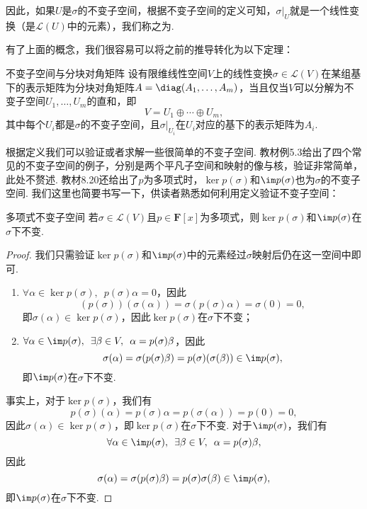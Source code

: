 因此，如果$U$是$\sigma$的不变子空间，根据不变子空间的定义可知，$\sigma\vert_U$就是一个线性变换（是$\mathcal{L}(U)$中的元素），我们称之为.

有了上面的概念，我们很容易可以将之前的推导转化为以下定理：
\begin{theorem}{}{不变子空间与分块对角矩阵}
    设有限维线性空间$V$上的线性变换$\sigma\in\mathcal{L}(V)$在某组基下的表示矩阵为分块对角矩阵$A=\diag(A_1,\ldots,A_m)$，当且仅当$V$可以分解为不变子空间$U_1,\ldots,U_m$的直和，即
    \[V=U_1\oplus\cdots\oplus U_m,\]
    其中每个$U_i$都是$\sigma$的不变子空间，且$\sigma\vert_{U_i}$在$U_i$对应的基下的表示矩阵为$A_i$.
\end{theorem}

根据定义我们可以验证或者求解一些很简单的不变子空间. 教材例5.3给出了四个常见的不变子空间的例子，分别是两个平凡子空间和映射的像与核，验证非常简单，此处不赘述. 教材8.20还给出了$p$为多项式时，$\ker p(\sigma)$和$\im p(\sigma)$也为$\sigma$的不变子空间. 我们这里也简要书写一下，供读者熟悉如何利用定义验证不变子空间：
\begin{example}{}{多项式不变子空间}
    若$\sigma\in\mathcal{L}(V)$且$p\in\mathbf{F}[x]$为多项式，则$\ker p(\sigma)$和$\im p(\sigma)$在$\sigma$下不变.
\end{example}

\begin{proof}
    我们只需验证$\ker p(\sigma)$和$\im p(\sigma)$中的元素经过$\sigma$映射后仍在这一空间中即可.
    \begin{enumerate}
        \item $\forall \alpha\in \ker p(\sigma),\enspace p(\sigma)\alpha=0$，因此
              \[(p(\sigma))(\sigma(\alpha))=\sigma(p(\sigma)\alpha)=\sigma(0)=0,\]
              即$\sigma(\alpha)\in \ker p(\sigma)$，因此$\ker p(\sigma)$在$\sigma$下不变；

        \item $\forall \alpha\in \im p(\sigma),\enspace \exists \beta\in V,\enspace \alpha=p(\sigma)\beta$，因此
              \[\sigma(\alpha)=\sigma(p(\sigma)\beta)=p(\sigma)(\sigma(\beta))\in \im p(\sigma),\]
              即$\im p(\sigma)$在$\sigma$下不变.
    \end{enumerate}
    事实上，对于$\ker p(\sigma)$，我们有
    \[ p(\sigma)(\alpha)=p(\sigma)\alpha=p(\sigma(\alpha))=p(0)=0,\]
    因此$\sigma(\alpha)\in \ker p(\sigma)$，即$\ker p(\sigma)$在$\sigma$下不变. 对于$\im p(\sigma)$，我们有
    \[\forall \alpha\in \im p(\sigma),\enspace \exists \beta\in V,\enspace \alpha=p(\sigma)\beta,\]
    因此
    \[\sigma(\alpha)=\sigma(p(\sigma)\beta)=p(\sigma)\sigma(\beta)\in \im p(\sigma),\]
    即$\im p(\sigma)$在$\sigma$下不变.
\end{proof}

